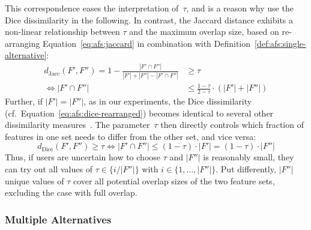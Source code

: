 \documentclass{article}
\theoremstyle{definition}
\begin{document}
This correspondence eases the interpretation of~$\tau$, and is a reason why use the Dice dissimilarity in the following.
In contrast, the Jaccard distance exhibits a non-linear relationship between $\tau$ and the maximum overlap size, based on re-arranging Equation~\ref{eq:afs:jaccard} in combination with Definition~\ref{def:afs:single-alternative}:
%
\begin{equation}
	\begin{aligned}
		d_{\text{Jacc}}(F',F'') = 1 - \frac{|F' \cap F''|}{|F'| + |F''| - |F' \cap F''|} &\geq \tau \\
		\Leftrightarrow |F' \cap F''| &\leq \frac{1 - \tau}{2 - \tau} \cdot (|F'| + |F''|)
		\end{aligned}
	\label{eq:afs:jaccard-rearranged}
\end{equation}
%
Further, if $|F'| = |F''|$, as in our experiments, the Dice dissimilarity (cf.~Equation~\ref{eq:afs:dice-rearranged}) becomes identical to several other dissimilarity measures~\cite{egghe2009new}.
The parameter~$\tau$ then directly controls which fraction of features in one set needs to differ from the other set, and vice versa:
%
\begin{equation}
	d_{\text{Dice}}(F',F'') \geq \tau \Leftrightarrow |F' \cap F''| \leq (1 - \tau) \cdot |F'| = (1 - \tau) \cdot |F''|
	\label{eq:afs:dice-rearranged-equal-size}
\end{equation}
%
Thus, if users are uncertain how to choose $\tau$ and $|F''|$ is reasonably small, they can try out all values of $\tau \in \{i / |F''|\}$ with $i \in \{1, \dots, |F''|\}$.
Put differently, $|F''|$ unique values of $\tau$ cover all potential overlap sizes of the two feature sets, excluding the case with full overlap.

\subsubsection{Multiple Alternatives}
\label{sec:afs:approach:constraints:multiple}
\end{document}
